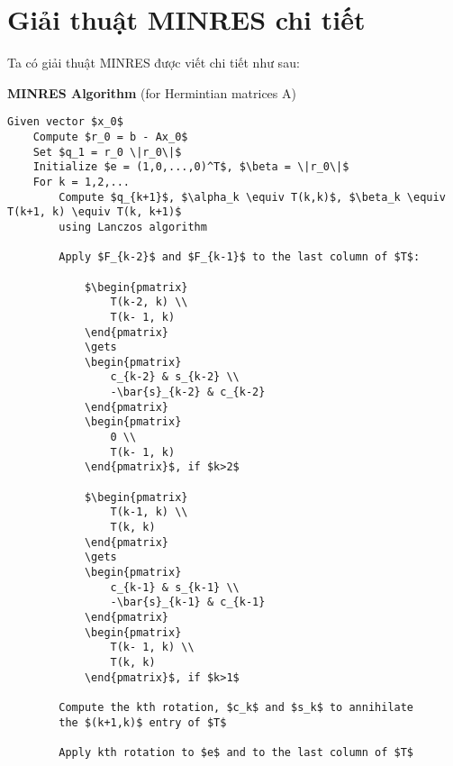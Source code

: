 \section{Giải thuật MINRES chi tiết}
Ta có giải thuật MINRES được viết chi tiết như sau:

\textbf{MINRES Algorithm} (for Hermintian matrices A)
\begin{lstlisting}[style=algo]
    Given vector $x_0$ 
    Compute $r_0 = b - Ax_0$
    Set $q_1 = r_0 \|r_0\|$
    Initialize $e = (1,0,...,0)^T$, $\beta = \|r_0\|$
    For k = 1,2,...
        Compute $q_{k+1}$, $\alpha_k \equiv T(k,k)$, $\beta_k \equiv T(k+1, k) \equiv T(k, k+1)$
        using Lanczos algorithm

        Apply $F_{k-2}$ and $F_{k-1}$ to the last column of $T$:

            $\begin{pmatrix}
                T(k-2, k) \\
                T(k- 1, k)
            \end{pmatrix}
            \gets 
            \begin{pmatrix}
                c_{k-2} & s_{k-2} \\
                -\bar{s}_{k-2} & c_{k-2}
            \end{pmatrix}
            \begin{pmatrix}
                0 \\
                T(k- 1, k)
            \end{pmatrix}$, if $k>2$

            $\begin{pmatrix}
                T(k-1, k) \\
                T(k, k)
            \end{pmatrix}
            \gets 
            \begin{pmatrix}
                c_{k-1} & s_{k-1} \\
                -\bar{s}_{k-1} & c_{k-1}
            \end{pmatrix}
            \begin{pmatrix}
                T(k- 1, k) \\
                T(k, k)
            \end{pmatrix}$, if $k>1$

        Compute the kth rotation, $c_k$ and $s_k$ to annihilate 
        the $(k+1,k)$ entry of $T$

        Apply kth rotation to $e$ and to the last column of $T$


\end{lstlisting}
